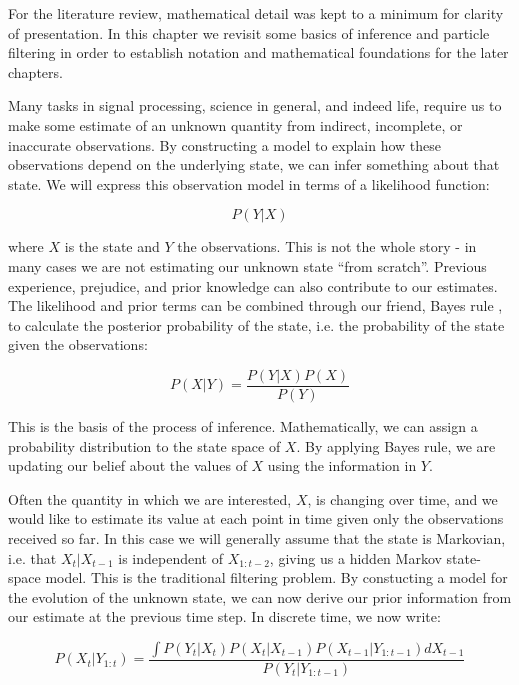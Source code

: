 For the literature review, mathematical detail was kept to a minimum for clarity of presentation. In this chapter we revisit some basics of inference and particle filtering in order to establish notation and mathematical foundations for the later chapters.

Many tasks in signal processing, science in general, and indeed life, require us to make some estimate of an unknown quantity from indirect, incomplete, or inaccurate observations. By constructing a model to explain how these observations depend on the underlying state, we can infer something about that state. We will express this observation model in terms of a likelihood function:

\begin{equation}
P(Y|X)
\label{eq:LH}
\end{equation}

where $X$ is the state and $Y$ the observations. This is not the whole story - in many cases we are not estimating our unknown state ``from scratch''. Previous experience, prejudice, and prior knowledge can also contribute to our estimates. The likelihood and prior terms can be combined through our friend, Bayes rule \cite{Bayes1763,Laplace1774}, to calculate the posterior probability of the state, i.e. the probability of the state given the observations:

\begin{equation}
P(X|Y) = \frac{P(Y|X)P(X)}{P(Y)}
\label{eq:BayesRule}
\end{equation}

This is the basis of the process of inference. Mathematically, we can assign a probability distribution to the state space of $X$. By applying Bayes rule, we are updating our belief about the values of $X$ using the information in $Y$.

Often the quantity in which we are interested, $X$, is changing over time, and we would like to estimate its value at each point in time given only the observations received so far. In this case we will generally assume that the state is Markovian, i.e. that $X_t|X_{t-1}$ is independent of $X_{1:t-2}$, giving us a hidden Markov state-space model. This is the traditional filtering problem. By constucting a model for the evolution of the unknown state, we can now derive our prior information from our estimate at the previous time step. In discrete time, we now write:

\begin{equation}
P(X_t|Y_{1:t}) = \frac{\int P(Y_t|X_t)P(X_t|X_{t-1})P(X_{t-1}|Y_{1:t-1}) dX_{t-1}}{P(Y_t|Y_{1:t-1})}
\label{eq:SeqBayesRule}
\end{equation}

